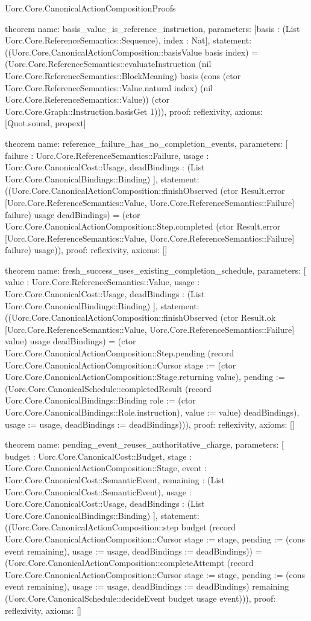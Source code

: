 \begin{lexlean}{Uorc.Core.CanonicalActionCompositionProofs}
\begin{semanticmodule}
theorem{
  name: basis_value_is_reference_instruction,
  parameters: [basis : (List Uorc.Core.ReferenceSemantics::Sequence), index : Nat],
  statement: ((Uorc.Core.CanonicalActionComposition::basisValue basis index) = (Uorc.Core.ReferenceSemantics::evaluateInstruction (nil Uorc.Core.ReferenceSemantics::BlockMeaning) basis (cons (ctor Uorc.Core.ReferenceSemantics::Value.natural index) (nil Uorc.Core.ReferenceSemantics::Value)) (ctor Uorc.Core.Graph::Instruction.basisGet 1))),
  proof: reflexivity{},
  axioms: [Quot.sound, propext]
}

theorem{
  name: reference_failure_has_no_completion_events,
  parameters: [
    failure : Uorc.Core.ReferenceSemantics::Failure,
    usage : Uorc.Core.CanonicalCost::Usage,
    deadBindings : (List Uorc.Core.CanonicalBindings::Binding)
  ],
  statement: ((Uorc.Core.CanonicalActionComposition::finishObserved (ctor Result.error [Uorc.Core.ReferenceSemantics::Value, Uorc.Core.ReferenceSemantics::Failure] failure) usage deadBindings) = (ctor Uorc.Core.CanonicalActionComposition::Step.completed (ctor Result.error [Uorc.Core.ReferenceSemantics::Value, Uorc.Core.ReferenceSemantics::Failure] failure) usage)),
  proof: reflexivity{},
  axioms: []
}

theorem{
  name: fresh_success_uses_existing_completion_schedule,
  parameters: [
    value : Uorc.Core.ReferenceSemantics::Value,
    usage : Uorc.Core.CanonicalCost::Usage,
    deadBindings : (List Uorc.Core.CanonicalBindings::Binding)
  ],
  statement: ((Uorc.Core.CanonicalActionComposition::finishObserved (ctor Result.ok [Uorc.Core.ReferenceSemantics::Value, Uorc.Core.ReferenceSemantics::Failure] value) usage deadBindings) = (ctor Uorc.Core.CanonicalActionComposition::Step.pending (record Uorc.Core.CanonicalActionComposition::Cursor {stage := (ctor Uorc.Core.CanonicalActionComposition::Stage.returning value), pending := (Uorc.Core.CanonicalSchedule::completedResult (record Uorc.Core.CanonicalBindings::Binding {role := (ctor Uorc.Core.CanonicalBindings::Role.instruction), value := value}) deadBindings), usage := usage, deadBindings := deadBindings}))),
  proof: reflexivity{},
  axioms: []
}

theorem{
  name: pending_event_reuses_authoritative_charge,
  parameters: [
    budget : Uorc.Core.CanonicalCost::Budget,
    stage : Uorc.Core.CanonicalActionComposition::Stage,
    event : Uorc.Core.CanonicalCost::SemanticEvent,
    remaining : (List Uorc.Core.CanonicalCost::SemanticEvent),
    usage : Uorc.Core.CanonicalCost::Usage,
    deadBindings : (List Uorc.Core.CanonicalBindings::Binding)
  ],
  statement: ((Uorc.Core.CanonicalActionComposition::step budget (record Uorc.Core.CanonicalActionComposition::Cursor {stage := stage, pending := (cons event remaining), usage := usage, deadBindings := deadBindings})) = (Uorc.Core.CanonicalActionComposition::completeAttempt (record Uorc.Core.CanonicalActionComposition::Cursor {stage := stage, pending := (cons event remaining), usage := usage, deadBindings := deadBindings}) remaining (Uorc.Core.CanonicalSchedule::decideEvent budget usage event))),
  proof: reflexivity{},
  axioms: []
}


\end{semanticmodule}
\end{lexlean}
